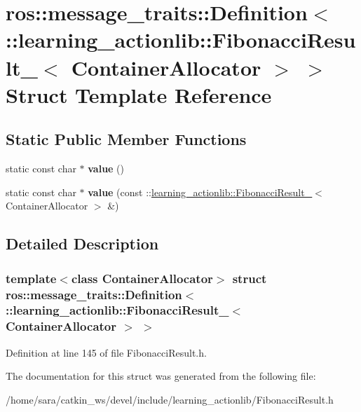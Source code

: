 \hypertarget{structros_1_1message__traits_1_1Definition_3_01_1_1learning__actionlib_1_1FibonacciResult___3_01ContainerAllocator_01_4_01_4}{}\section{ros\+:\+:message\+\_\+traits\+:\+:Definition$<$ \+:\+:learning\+\_\+actionlib\+:\+:Fibonacci\+Result\+\_\+$<$ Container\+Allocator $>$ $>$ Struct Template Reference}
\label{structros_1_1message__traits_1_1Definition_3_01_1_1learning__actionlib_1_1FibonacciResult___3_01ContainerAllocator_01_4_01_4}
\subsection*{Static Public Member Functions}
\begin{DoxyCompactItemize}
\item 
\mbox{\label{structros_1_1message__traits_1_1Definition_3_01_1_1learning__actionlib_1_1FibonacciResult___3_01ContainerAllocator_01_4_01_4_a41f3d1472d6dd67f869082be09336bdc}} 
static const char $\ast$ {\bfseries value} ()
\item 
\mbox{\label{structros_1_1message__traits_1_1Definition_3_01_1_1learning__actionlib_1_1FibonacciResult___3_01ContainerAllocator_01_4_01_4_ab846758a253c715bd2b23ec6c8aae538}} 
static const char $\ast$ {\bfseries value} (const \+::\hyperlink{structlearning__actionlib_1_1FibonacciResult__}{learning\+\_\+actionlib\+::\+Fibonacci\+Result\+\_\+}$<$ Container\+Allocator $>$ \&)
\end{DoxyCompactItemize}


\subsection{Detailed Description}
\subsubsection*{template$<$class Container\+Allocator$>$\newline
struct ros\+::message\+\_\+traits\+::\+Definition$<$ \+::learning\+\_\+actionlib\+::\+Fibonacci\+Result\+\_\+$<$ Container\+Allocator $>$ $>$}



Definition at line 145 of file Fibonacci\+Result.\+h.



The documentation for this struct was generated from the following file\+:\begin{DoxyCompactItemize}
\item 
/home/sara/catkin\+\_\+ws/devel/include/learning\+\_\+actionlib/Fibonacci\+Result.\+h\end{DoxyCompactItemize}
